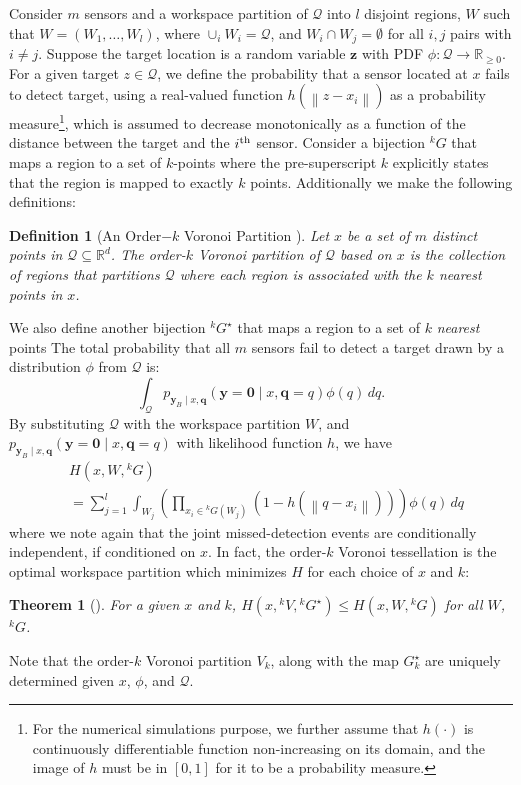 \documentclass[letterpaper, 10 pt, conference]{ieeeconf}
\newtheorem{definition}{Definition}[section]
\newtheorem{theorem}{Theorem}[section]
\newcommand{\Ram}[1]{{\normalsize{\textbf{({\color{green}Ram:\ }#1)}}}}
\newcommand{\HJ}[1]{{\color{black}{#1}}}
\begin{document}
Consider $m$ sensors and a workspace partition of $\mathcal{Q}$ into $l$ disjoint regions, $W$ such that $W = (W_1,\dots,W_l)$, where $\cup_i W_i = \mathcal{Q}$, and $W_i \cap W_j = \emptyset$ for all $i,j$ pairs with $i \neq j$. 
Suppose the target location is a random variable $\bm{z}$ with PDF $\phi:\mathcal{Q} \rightarrow \mathbb{R}_{\geq 0}$.
For a given target $z \in \mathcal{Q}$, we define the probability that a sensor located at $x$ fails to detect target, using a real-valued function $h(\left\|z - x_i\right\|)$ as a probability measure\footnote{For the numerical simulations purpose, we further assume that $h(\cdot)$ is continuously differentiable function non-increasing on its domain, and the image of $h$ must be in $[0,1]$ for it to be a probability measure.}, which is assumed to decrease monotonically as a function of the distance between the target and the $i^{\textup{th}}$ sensor. 
Consider a bijection ${}^kG$ that maps a region to a set of $k$-points where the pre-superscript $k$ explicitly states that the region is mapped to exactly $k$ points.
Additionally we make the following definitions:
\begin{definition}[An Order$-k$ Voronoi Partition \cite{shamos1975closest}]
	Let $x$ be a set of $m$ distinct points in $\mathcal{Q}\subseteq \mathbb{R}^d$. 
	The \emph{order-$k$ Voronoi partition of $\mathcal{Q}$ based on $x$}\HJ{, namely ${}^kV$,} is the collection of regions that partitions $\mathcal{Q}$ where each region is associated with the $k$ nearest points in $x$.
	\label{orderk}
\end{definition}
We also define another bijection ${}^kG^{\star}$ that maps a region to a set of $k$ \emph{nearest} points \HJ{(out of $x$) to the region.} 
The total probability that all $m$ sensors fail to detect a target drawn by a distribution $\phi$ from $\mathcal{Q}$ is:
\begin{equation}
\int_{\mathcal{Q}} p_{\bm{y}_{B} \mid x,\bm{q}
}\left(\bm{y} = \mathbf{0} \mid x,\bm{q}=q
\right)\phi(q)\,{dq}.
\end{equation}
By substituting $\mathcal{Q}$ with the workspace partition $W$, and $p_{\bm{y}_{B} \mid x,\bm{q}
}\left(\bm{y} = \mathbf{0} \mid x,\bm{q}=q
\right)$ with likelihood function $h$, we have
\begin{align}
&H(x,W,{}^kG) \nonumber \\
&= \sum_{j = 1}^l \int_{W_j} \left( \prod_{x_i \in {}^kG(W_j)} \left(1- h \left(\left\|
q - x_i \right\|  \right) \right) \right)\phi(q)\,dq
\label{cost2}
\end{align}
where we note again that the joint missed-detection events are conditionally independent, if conditioned on $x$.
In fact, the order-$k$ Voronoi tessellation is the optimal workspace partition which minimizes $H$ for each choice of $x$ and $k$:
\begin{theorem}[\cite{park2014robust}]
	For a given $x$ and $k$,
	$
	H(x,{}^{k}V,{}^kG^{\star}) \leq H(x,W,{}^{k}G)
	$
	for all $W$, ${}^{k}G$.
\end{theorem}
\noindent Note that the order-$k$ Voronoi partition $V_k$, along with the map $G_k^{\star}$ are uniquely determined given $x$, $\phi$, and $\mathcal{Q}$. 
\end{document}
